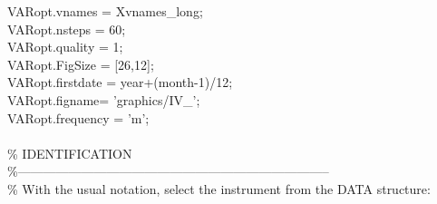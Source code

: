 \hspace{1mm}\hspace{5mm} \hspace{5mm} VARopt.vnames = Xvnames\_long; \\ 
\hspace{1mm}\hspace{5mm} \hspace{5mm} VARopt.nsteps = 60; \\ 
\hspace{1mm}\hspace{5mm} \hspace{5mm} VARopt.quality = 1; \\ 
\hspace{1mm}\hspace{5mm} \hspace{5mm} VARopt.FigSize = [26,12]; \\ 
\hspace{1mm}\hspace{5mm} \hspace{5mm} VARopt.firstdate = year+(month-1)/12; \\ 
\hspace{1mm}\hspace{5mm} \hspace{5mm} VARopt.figname= \textcolor{matlabpurple}{'graphics/IV\_'}; \\ 
\hspace{1mm}\hspace{5mm} \hspace{5mm} VARopt.frequency = \textcolor{matlabpurple}{'m'}; \\ 
\hspace{1mm}\hspace{5mm} \hspace{5mm}  \\ 
\hspace{1mm}\hspace{5mm} \hspace{5mm} \textcolor{matlabgreen}{\% IDENTIFICATION }\\ 
\hspace{1mm}\hspace{5mm} \hspace{5mm} \textcolor{matlabgreen}{\%--------------------------------------------------------------------------  }\\ 
\hspace{1mm}\hspace{5mm} \hspace{5mm} \textcolor{matlabgreen}{\% With the usual notation, select the instrument from the DATA structure: }\\ 
